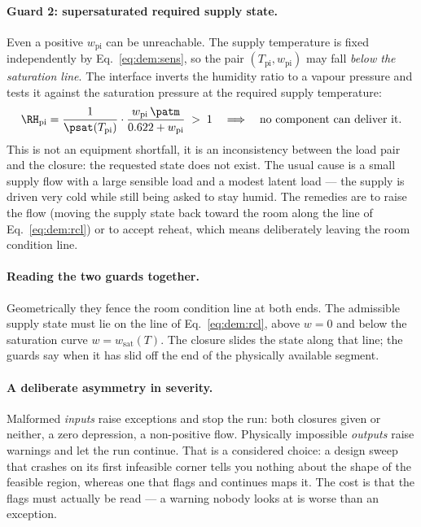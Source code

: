 \paragraph{Guard 2: supersaturated required supply state.} Even a positive
$w_{\mathrm{pi}}$ can be unreachable. The supply temperature is fixed
independently by Eq.~\eqref{eq:dem:sens}, so the pair
$(T_{\mathrm{pi}},w_{\mathrm{pi}})$ may fall \emph{below the saturation line}.
The interface inverts the humidity ratio to a vapour pressure and tests it
against the saturation pressure at the required supply temperature:
\begin{equation}
\RH_{\mathrm{pi}}
=\frac{1}{\psat(T_{\mathrm{pi}})}\cdot
\frac{w_{\mathrm{pi}}\,\patm}{0.622+w_{\mathrm{pi}}}\;>\;1
\quad\Longrightarrow\quad\text{no component can deliver it.}
\label{eq:dem:guard2}
\end{equation}
This is not an equipment shortfall, it is an inconsistency between the load pair
and the closure: the requested state does not exist. The usual cause is a small
supply flow with a large sensible load and a modest latent load --- the supply is
driven very cold while still being asked to stay humid. The remedies are to raise
the flow (moving the supply state back toward the room along the line of
Eq.~\eqref{eq:dem:rcl}) or to accept reheat, which means deliberately leaving the
room condition line.

\paragraph{Reading the two guards together.} Geometrically they fence the room
condition line at both ends. The admissible supply state must lie on the line of
Eq.~\eqref{eq:dem:rcl}, above $w=0$ and below the saturation curve
$w=w_{\mathrm{sat}}(T)$. The closure slides the state along that line; the guards
say when it has slid off the end of the physically available segment.

\paragraph{A deliberate asymmetry in severity.} Malformed \emph{inputs} raise
exceptions and stop the run: both closures given or neither, a zero depression, a
non-positive flow. Physically impossible \emph{outputs} raise warnings and let
the run continue. That is a considered choice: a design sweep that crashes on its
first infeasible corner tells you nothing about the shape of the feasible region,
whereas one that flags and continues maps it. The cost is that the flags must
actually be read --- a warning nobody looks at is worse than an exception.

